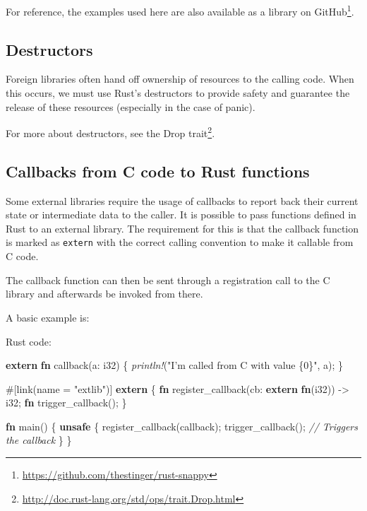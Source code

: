 \documentclass[a4paper,]{book}
\newenvironment{Shaded}{\begin{snugshade}}{\end{snugshade}}
\newcommand{\KeywordTok}[1]{\textcolor[rgb]{0.13,0.29,0.53}{\textbf{{#1}}}}
\newcommand{\DataTypeTok}[1]{\textcolor[rgb]{0.13,0.29,0.53}{{#1}}}
\newcommand{\StringTok}[1]{\textcolor[rgb]{0.31,0.60,0.02}{{#1}}}
\newcommand{\CommentTok}[1]{\textcolor[rgb]{0.56,0.35,0.01}{\textit{{#1}}}}
\newcommand{\PreprocessorTok}[1]{\textcolor[rgb]{0.56,0.35,0.01}{\textit{{#1}}}}
\newcommand{\AttributeTok}[1]{\textcolor[rgb]{0.77,0.63,0.00}{{#1}}}
\newcommand{\NormalTok}[1]{{#1}}
\renewcommand{\href}[2]{#2\footnote{\url{#1}}}
\begin{document}
For reference, the examples used here are also available as a
\href{https://github.com/thestinger/rust-snappy}{library on GitHub}.

\subsection{Destructors}\label{destructors}

Foreign libraries often hand off ownership of resources to the calling
code. When this occurs, we must use Rust's destructors to provide safety
and guarantee the release of these resources (especially in the case of
panic).

For more about destructors, see the
\href{http://doc.rust-lang.org/std/ops/trait.Drop.html}{Drop trait}.

\subsection{Callbacks from C code to Rust
functions}\label{callbacks-from-c-code-to-rust-functions}

Some external libraries require the usage of callbacks to report back
their current state or intermediate data to the caller. It is possible
to pass functions defined in Rust to an external library. The
requirement for this is that the callback function is marked as
\texttt{extern} with the correct calling convention to make it callable
from C code.

The callback function can then be sent through a registration call to
the C library and afterwards be invoked from there.

A basic example is:

Rust code:

\begin{Shaded}
\begin{Highlighting}[]
\KeywordTok{extern} \KeywordTok{fn} \NormalTok{callback(a: }\DataTypeTok{i32}\NormalTok{) \{}
    \PreprocessorTok{println!}\NormalTok{(}\StringTok{"I'm called from C with value \{0\}"}\NormalTok{, a);}
\NormalTok{\}}

\AttributeTok{#[}\NormalTok{link}\AttributeTok{(}\NormalTok{name }\AttributeTok{=} \StringTok{"extlib"}\AttributeTok{)]}
\KeywordTok{extern} \NormalTok{\{}
   \KeywordTok{fn} \NormalTok{register_callback(cb: }\KeywordTok{extern} \KeywordTok{fn}\NormalTok{(}\DataTypeTok{i32}\NormalTok{)) -> }\DataTypeTok{i32}\NormalTok{;}
   \KeywordTok{fn} \NormalTok{trigger_callback();}
\NormalTok{\}}

\KeywordTok{fn} \NormalTok{main() \{}
    \KeywordTok{unsafe} \NormalTok{\{}
        \NormalTok{register_callback(callback);}
        \NormalTok{trigger_callback(); }\CommentTok{// Triggers the callback}
    \NormalTok{\}}
\NormalTok{\}}
\end{Highlighting}
\end{Shaded}
\end{document}

